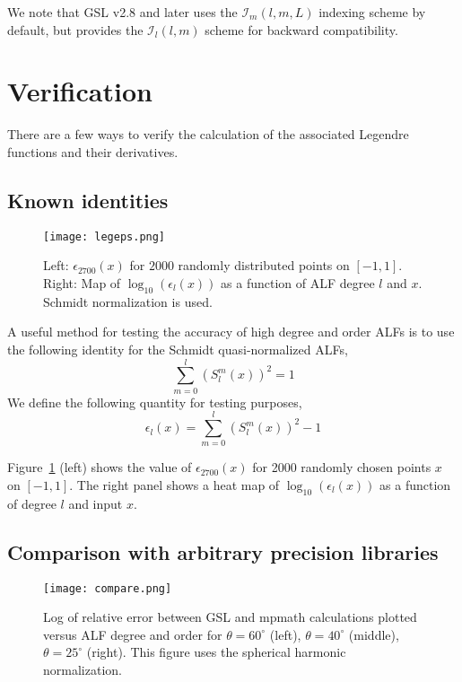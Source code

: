 \documentclass[12pt]{article}
\begin{document}
We note that GSL v2.8 and later uses the $\mathcal{I}_m(l,m,L)$ indexing scheme by default, but provides
the $\mathcal{I}_l(l,m)$ scheme for backward compatibility.

\section{Verification}

There are a few ways to verify the calculation of the associated
Legendre functions and their derivatives.

\subsection{Known identities}

\begin{figure}[ht]
\texttt{[image: legeps.png]}
\caption{Left: $\epsilon_{2700}(x)$ for $2000$ randomly distributed points
on $[-1,1]$. Right: Map of $\log_{10}(\epsilon_l(x))$ as a function of
ALF degree $l$ and $x$. Schmidt normalization is used.
}
\label{fig:legeps}
\end{figure}

A useful method for testing the accuracy of high degree and order
ALFs is to use the following identity for the Schmidt quasi-normalized
ALFs,
\begin{equation}
\sum_{m=0}^l \left( S_l^m(x) \right)^2 = 1 \label{eqn:S1}
\end{equation}
We define the following quantity for testing purposes,
\begin{equation}
\epsilon_l(x) = \sum_{m=0}^l \left( S_l^m(x) \right)^2 - 1
\end{equation}

Figure~\ref{fig:legeps} (left) shows the value of $\epsilon_{2700}(x)$
for 2000 randomly chosen points $x$ on $[-1,1]$. The right panel shows
a heat map of $\log_{10}(\epsilon_l(x))$ as a function of degree $l$ and
input $x$.

\subsection{Comparison with arbitrary precision libraries}

\begin{figure}[ht]
\texttt{[image: compare.png]}
\caption{
Log of relative error between GSL and mpmath calculations plotted versus
ALF degree and order for $\theta = 60^{\circ}$ (left),
$\theta = 40^{\circ}$ (middle),
$\theta = 25^{\circ}$ (right). This figure uses the spherical
harmonic normalization.
}
\label{fig:compare}
\end{figure}
\end{document}
